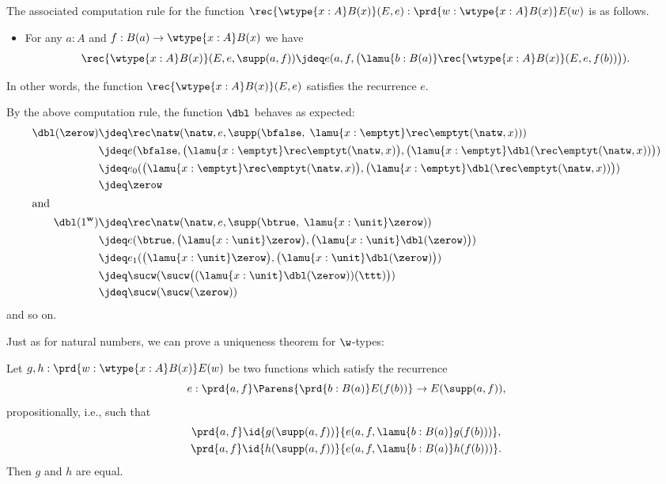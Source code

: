 The associated computation rule for the function $\rec{\wtype{x:A} B(x)}(E,e) : \prd{w : \wtype{x:A} B(x)} E(w)$ is as follows.
%
\begin{itemize}
\item
  For any $a : A$ and $f : B(a) \to \wtype{x:A} B(x)$ we have
  \begin{equation*}
    \rec{\wtype{x:A} B(x)}(E,e,\supp(a,f)) \jdeq
    e(a,f,\big(\lamu{b:B(a)} \rec{\wtype{x:A} B(x)}(E,e,f(b))\big)).
  \end{equation*}
\end{itemize}
In other words, the function $\rec{\wtype{x:A} B(x)}(E,e)$ satisfies the recurrence $e$.

By the above computation rule, the function $\dbl$ behaves as expected:
\begin{align*}
\dbl(\zerow) & \jdeq \rec\natw(\natw, e, \supp(\bfalse, \; \lamu{x:\emptyt} \rec\emptyt(\natw,x))) \\
& \jdeq e(\bfalse, \big(\lamu{x:\emptyt} \rec\emptyt(\natw,x)\big),
   \big(\lamu{x:\emptyt} \dbl(\rec\emptyt(\natw,x))\big)) \\
 & \jdeq e_0(\big(\lamu{x:\emptyt} \rec\emptyt(\natw,x)\big), \big(\lamu{x:\emptyt} \dbl(\rec\emptyt(\natw,x))\big))\\
 & \jdeq \zerow \\
 \intertext{and}
\dbl(1^{\mathbf{w}}) & \jdeq \rec\natw(\natw, e, \supp(\btrue, \; \lamu{x:\unit} \zerow)) \\
& \jdeq e(\btrue, \big(\lamu{x:\unit} \zerow\big), \big(\lamu{x:\unit} \dbl(\zerow)\big)) \\
 & \jdeq e_1(\big(\lamu{x:\unit} \zerow\big), \big(\lamu{x:\unit} \dbl(\zerow)\big)) \\
 & \jdeq \sucw(\sucw\big((\lamu{x:\unit} \dbl(\zerow))(\ttt)\big))\\
 & \jdeq \sucw(\sucw(\zerow))
\end{align*}
and so on.

Just as for natural numbers, we can prove a uniqueness theorem for
$\w$-types:
\begin{thm}\label{thm:w-uniq}
Let $g,h : \prd{w:\wtype{x:A}B(x)} E(w)$ be two functions which satisfy the recurrence
%
\begin{equation*}
  e : \prd{a,f} \Parens{\prd{b : B(a)} E(f(b))} \to  E(\supp(a,f)),
\end{equation*}
%
propositionally, i.e., such that
%
\begin{gather*}
 \prd{a,f} \id{g(\supp(a,f))} {e(a,f,\lamu{b:B(a)} g(f(b)))}, \\
 \prd{a,f} \id{h(\supp(a,f))}{e(a,f,\lamu{b:B(a)} h(f(b)))}.
\end{gather*}
Then $g$ and $h$ are equal.
\end{thm}


